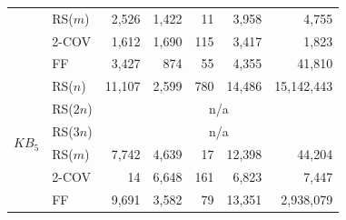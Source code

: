 \begin{tabular}{llrrrrr}
 & RS($m$) & 2{,}526 & 1{,}422 & 11 & 3{,}958 & 4{,}755 \\
 & 2-COV & 1{,}612 & 1{,}690 & 115 & 3{,}417 & 1{,}823 \\
 & FF & 3{,}427 & 874 & 55 & 4{,}355 & 41{,}810 \\
\midrule
\multirow{6}{*}{$KB_5$} & RS($n$) & 11{,}107 & 2{,}599 & 780 & 14{,}486 & 15{,}142{,}443 \\
 & RS($2n$) & \multicolumn{5}{c}{n/a} \\
 & RS($3n$) & \multicolumn{5}{c}{n/a} \\
 & RS($m$) & 7{,}742 & 4{,}639 & 17 & 12{,}398 & 44{,}204 \\
 & 2-COV & 14 & 6{,}648 & 161 & 6{,}823 & 7{,}447 \\
 & FF & 9{,}691 & 3{,}582 & 79 & 13{,}351 & 2{,}938{,}079 \\
\bottomrule
\end{tabular}
